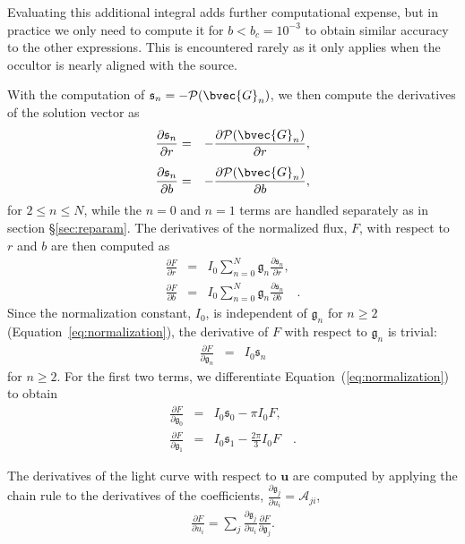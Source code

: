 \documentclass[modern,trackchanges]{aastex63}
\begin{document}
Evaluating this additional integral adds further computational expense, but in
practice we only need to compute it for $b < b_c = 10^{-3}$ to obtain similar accuracy
to the other expressions.  This is encountered rarely as it only applies when the
occultor is nearly aligned with the source.

With the computation of $\mathfrak{s}_n = -\mathcal{P}(\bvec{G}_n)$, we then
compute the derivatives of the solution vector as
\begin{eqnarray}
\frac{\partial \mathfrak{s}_n}{\partial r} &= & -\frac{\partial \mathcal{P}(\bvec{G}_n)}{\partial r},\\[0.5em]
\frac{\partial \mathfrak{s}_n}{\partial b} &= & -\frac{\partial \mathcal{P}(\bvec{G}_n)}{\partial b},
\end{eqnarray}
for $2 \le n \le N$, while the $n=0$ and $n=1$ terms are handled separately as in
section \S\ref{sec:reparam}.
%
The derivatives of the normalized flux, $F$, with respect to $r$ and $b$
are then computed as
%
\begin{eqnarray}\label{eq:derivatives}
\frac{\partial F}{\partial r} &=& I_0 \sum_{n=0}^N \mathfrak{g}_n \frac{\partial \mathfrak{s}_n}{\partial r},\\[0.5em]
\frac{\partial F}{\partial b} &=& I_0 \sum_{n=0}^N \mathfrak{g}_n \frac{\partial \mathfrak{s}_n}{\partial b} \quad.
\end{eqnarray}
%
Since the normalization constant, $I_0$,
is independent of $\mathfrak{g}_n$ for $n \ge 2$ (Equation~\ref{eq:normalization}), the derivative of $F$
with respect to $\mathfrak{g}_n$ is trivial:
%
\begin{eqnarray}
    \frac{\partial F}{\partial \mathfrak{g}_n} &=&  I_0 \mathfrak{s}_n
\end{eqnarray}
%
for $n \ge 2$. For the first two terms, we differentiate
Equation~(\ref{eq:normalization}) to obtain
%
\begin{eqnarray}
\frac{\partial F}{\partial \mathfrak{g}_0} &=&  I_0 \mathfrak{s}_0 - \pi I_0 F,\\[0.5em]
\frac{\partial F}{\partial \mathfrak{g}_1} &=&  I_0 \mathfrak{s}_1 - \frac{2\pi}{3} I_0 F\quad.
\end{eqnarray}

The derivatives of the light curve with respect to $\mathbf{u}$ are computed by applying
the chain rule to the derivatives of the coefficients, 
$\frac{\partial \mathfrak{g}_j}{\partial u_i} = \mathcal{A}_{ji}$,
\begin{eqnarray}\label{eq:dFdu}
\frac{\partial F}{\partial u_i} =  \sum_{j} \frac{\partial \mathfrak{g}_j}{\partial u_i}\frac{\partial F}{\partial \mathfrak{g}_j}.
\end{eqnarray}
\end{document}
